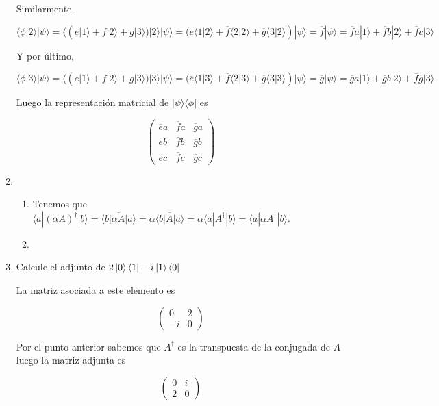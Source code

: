 \documentclass[letter,twoside,12pt]{article}
\begin{document}
\begin{enumerate}
Similarmente,

$ \langle \phi | 2 \rangle |\psi \rangle = \langle (e|1\rangle + f|2\rangle +g|3\rangle)| 2 \rangle |\psi \rangle  = (\overline{e}\langle 1|2 \rangle + \overline{f}\langle 2|2 \rangle + \overline{g}\langle 3|2 \rangle )|\psi \rangle = \overline{f}|\psi \rangle = \overline{f}a|1 \rangle + \overline{f}b|2 \rangle + \overline{f}c|3 \rangle$

Y por último,

$ \langle \phi | 3 \rangle |\psi \rangle = \langle (e|1\rangle + f|2\rangle +g|3\rangle)| 3 \rangle |\psi \rangle  = (\overline{e}\langle 1|3 \rangle + \overline{f}\langle 2|3 \rangle + \overline{g}\langle 3|3 \rangle )|\psi \rangle = \overline{g}|\psi \rangle = \overline{g}a|1 \rangle + \overline{g}b|2 \rangle + \overline{f}g|3 \rangle$

Luego la representación matricial de $ |\psi \rangle \langle \phi | $ es 

$$ \begin{pmatrix}
\overline{e}a & \overline{f}a & \overline{g}a
\\\overline{e}b & \overline{f}b & \overline{g}b
\\\overline{e}c & \overline{f}c & \overline{g}c
\end{pmatrix} $$

\item \begin{enumerate}
\item Tenemos que $ \langle a | (\alpha A)^\dagger | b \rangle = \overline{\langle b | \alpha A | a \rangle} = \overline{\alpha} \overline{\langle b | A | a \rangle} = \overline{\alpha}{\langle a | A^\dagger | b \rangle} ={\langle a | \overline{\alpha} A^\dagger | b \rangle} $.

\item 
\end{enumerate}

\item Calcule el adjunto de $ 2\ket{0}\bra{1}-i\ket{1}\bra{0} $

La matriz asociada a este elemento es 

$$ \begin{pmatrix}
0 & 2
\\ -i & 0
\end{pmatrix} $$

Por el punto anterior sabemos que $ A^\dagger $ es la transpuesta de la conjugada de $ A $ luego la matriz adjunta es
 
$$ \begin{pmatrix}
0 & i
\\ 2 & 0
\end{pmatrix} $$ 


\end{enumerate}
\end{document}
